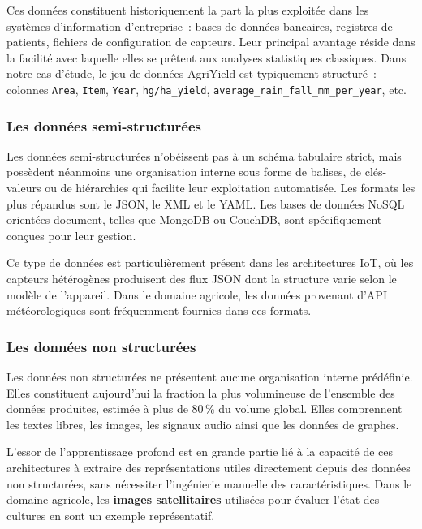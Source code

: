 Ces données constituent historiquement la part la plus exploitée dans les systèmes d'information d'entreprise~: bases de données bancaires, registres de patients, fichiers de configuration de capteurs. Leur principal avantage réside dans la facilité avec laquelle elles se prêtent aux analyses statistiques classiques. Dans notre cas d'étude, le jeu de données AgriYield est typiquement structuré~: colonnes \texttt{Area}, \texttt{Item}, \texttt{Year}, \texttt{hg/ha\_yield}, \texttt{average\_rain\_fall\_mm\_per\_year}, etc.

\subsubsection{Les données semi-structurées}

Les données semi-structurées n'obéissent pas à un schéma tabulaire strict, mais possèdent néanmoins une organisation interne sous forme de balises, de clés-valeurs ou de hiérarchies qui facilite leur exploitation automatisée. Les formats les plus répandus sont le JSON, le XML et le YAML. Les bases de données NoSQL orientées document, telles que MongoDB ou CouchDB, sont spécifiquement conçues pour leur gestion.

Ce type de données est particulièrement présent dans les architectures IoT, où les capteurs hétérogènes produisent des flux JSON dont la structure varie selon le modèle de l'appareil. Dans le domaine agricole, les données provenant d'API météorologiques sont fréquemment fournies dans ces formats.

\subsubsection{Les données non structurées}

Les données non structurées ne présentent aucune organisation interne prédéfinie. Elles constituent aujourd'hui la fraction la plus volumineuse de l'ensemble des données produites, estimée à plus de 80\,\% du volume global. Elles comprennent les textes libres, les images, les signaux audio ainsi que les données de graphes.

L'essor de l'apprentissage profond est en grande partie lié à la capacité de ces architectures à extraire des représentations utiles directement depuis des données non structurées, sans nécessiter l'ingénierie manuelle des caractéristiques. Dans le domaine agricole, les \textbf{images satellitaires} utilisées pour évaluer l'état des cultures en sont un exemple représentatif.

